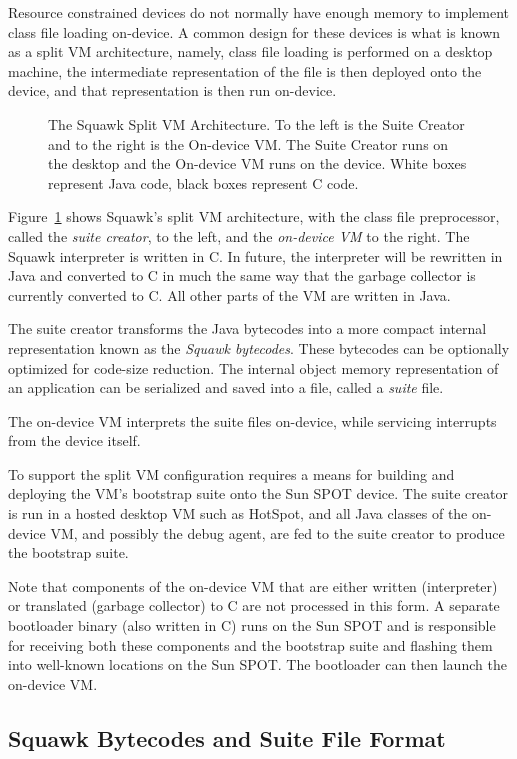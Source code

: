 \documentclass{sigplanconf}
\newcommand{\psfigbegin}[2]{\begin{figure}[htp] \centerline{\psfig{figure={#1},height={#2}}} }
\newcommand{\psfigend}[2]{{\small \bf \caption{\label{#1} {#2}}} \end{figure} }
\begin{document}
Resource constrained devices do not normally have enough memory
to implement class file loading on-device.  
A common design for these devices is what is known as a split 
VM architecture, namely, class file loading is performed on a 
desktop machine, the intermediate representation of the file is
then deployed onto the device, and that representation is then 
run on-device.  

\psfigbegin{SquawkSplitVM.eps}{6.5cm}
\psfigend{fig-squawk-arch}{The Squawk Split VM Architecture.  To the left is 
	the Suite Creator and to the right is the On-device VM.  
	The Suite Creator runs on the desktop and the On-device VM runs on 
	the device.  
	White boxes represent Java code, black boxes represent C code.}

Figure~\ref{fig-squawk-arch} shows Squawk's split VM architecture, 
with the class file preprocessor, called the {\em suite creator}, to the
left, and the {\em on-device VM} to the right.
The Squawk interpreter is written in C. In future, the interpreter
will be rewritten in Java and converted to C in much the same way that
the garbage collector is currently converted to C.
All other parts of the VM are written in Java. 

The suite creator transforms the Java bytecodes into a more compact 
internal representation known as the {\em Squawk bytecodes}.  These
bytecodes can be optionally optimized for code-size reduction. 
The internal object memory representation of an application can 
be serialized and saved into a file, called a {\em suite} file. 

The on-device VM interprets the suite files on-device, 
while servicing interrupts from the device itself.  

To support the split VM configuration requires a means for building and
deploying the VM's bootstrap suite onto the Sun SPOT device. The
suite creator is run in a hosted desktop VM such as HotSpot,
and all Java classes of the on-device VM, and possibly the debug
agent, are fed to the suite creator  to produce the bootstrap suite.

Note that components of the on-device VM that are either
written (interpreter) or translated (garbage collector) to C are not
processed in this form.  A separate bootloader binary (also written in
C) runs on the Sun SPOT and is responsible for receiving both these
components and the bootstrap suite and flashing them into well-known
locations on the Sun SPOT. The bootloader can then launch the
on-device VM.


\subsection{Squawk Bytecodes and Suite File Format}
\end{document}
